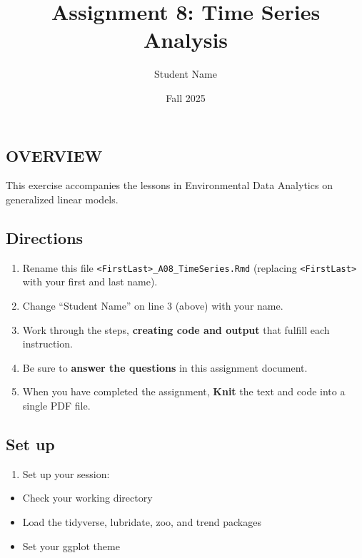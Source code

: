 \documentclass[
]{article}
\title{Assignment 8: Time Series Analysis}
\author{Student Name}
\date{Fall 2025}
\providecommand{\tightlist}{%
  \setlength{\itemsep}{0pt}\setlength{\parskip}{0pt}}
\begin{document}
\maketitle

\subsection{OVERVIEW}\label{overview}

This exercise accompanies the lessons in Environmental Data Analytics on
generalized linear models.

\subsection{Directions}\label{directions}

\begin{enumerate}
\def\labelenumi{\arabic{enumi}.}
\tightlist
\item
  Rename this file
  \texttt{\textless{}FirstLast\textgreater{}\_A08\_TimeSeries.Rmd}
  (replacing \texttt{\textless{}FirstLast\textgreater{}} with your first
  and last name).
\item
  Change ``Student Name'' on line 3 (above) with your name.
\item
  Work through the steps, \textbf{creating code and output} that fulfill
  each instruction.
\item
  Be sure to \textbf{answer the questions} in this assignment document.
\item
  When you have completed the assignment, \textbf{Knit} the text and
  code into a single PDF file.
\end{enumerate}

\subsection{Set up}\label{set-up}

\begin{enumerate}
\def\labelenumi{\arabic{enumi}.}
\tightlist
\item
  Set up your session:
\end{enumerate}

\begin{itemize}
\tightlist
\item
  Check your working directory
\item
  Load the tidyverse, lubridate, zoo, and trend packages
\item
  Set your ggplot theme
\end{itemize}
\end{document}
